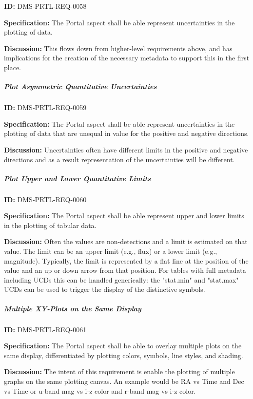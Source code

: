 \documentclass[SE,toc]{lsstdoc}
\begin{document}
\label{DMS-PRTL-REQ-0058}
\textbf{ID:} DMS-PRTL-REQ-0058

\textbf{Specification:}
The Portal aspect shall be able represent uncertainties in the plotting of data.

\textbf{Discussion:}
This flows down from higher-level requirements above, and has implications for the creation of the necessary metadata to support this in the first place.

\subparagraph{Plot Asymmetric Quantitative Uncertainties}\hfill  %

\label{DMS-PRTL-REQ-0059}
\textbf{ID:} DMS-PRTL-REQ-0059

\textbf{Specification:}
The Portal aspect shall be able represent uncertainties in the plotting of data that are unequal in value for the positive and negative directions.

\textbf{Discussion:}
Uncertainties often have different limits in the positive and negative directions and as a result representation of the uncertainties will be different.

\subparagraph{Plot Upper and Lower Quantitative Limits}\hfill  %

\label{DMS-PRTL-REQ-0060}
\textbf{ID:} DMS-PRTL-REQ-0060

\textbf{Specification:}
The Portal aspect shall be able represent upper and lower limits in the plotting of tabular data.

\textbf{Discussion:}
Often the values are non-detections and a limit is estimated on that value.  The limit can be an upper limit (e.g., flux) or a lower limit (e.g., magnitude).  Typically, the limit is represented by a flat line at the position of the value and an up or down arrow from that position.
For tables with full metadata including UCDs this can be handled generically: the "stat.min" and "stat.max" UCDs can be used to trigger the display of the distinctive symbols.

\subparagraph{Multiple XY-Plots on the Same Display}\hfill  %

\label{DMS-PRTL-REQ-0061}
\textbf{ID:} DMS-PRTL-REQ-0061

\textbf{Specification:}
The Portal aspect shall be able to overlay multiple plots on the same display, differentiated by plotting colors, symbols, line styles, and shading.

\textbf{Discussion:}
The intent of this requirement is enable the plotting of multiple graphs on the same plotting canvas.  An example would be RA vs Time and Dec vs Time or u-band mag vs i-z color and r-band mag vs i-z color.
\end{document}
